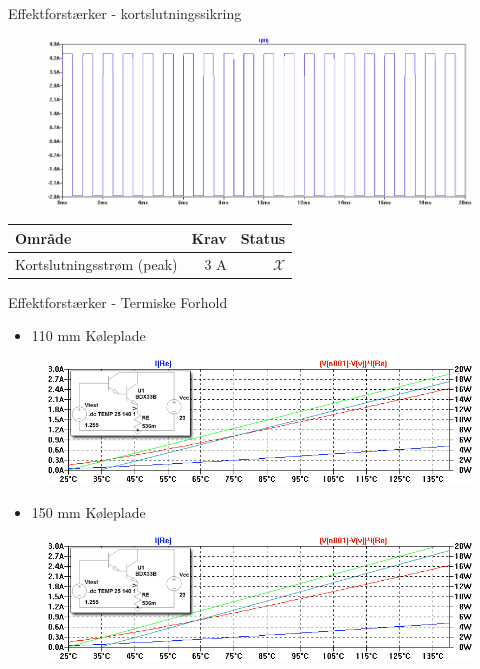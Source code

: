 \begin{frame}{Effektforstærker - kortslutningssikring}

\begin{figure}[h]
\centering
\includegraphics[width=\textwidth]{images/kortslut-graf.png}
\end{figure}

\scriptsize{\begin{table}[h]
\centering
\begin{tabular}{l|r|r}
\hline\hline
Område & Krav & Status  \\
\hline\hline
Kortslutningsstrøm (peak) & 3 A & $\mathcal{X}$\\
\hline\hline
\end{tabular}
\end{table}}

\end{frame}



\begin{frame}{Effektforstærker - Termiske Forhold}

\begin{itemize}
\item 110 mm Køleplade
\end{itemize}
\begin{figure}[h]
\centering
\includegraphics[width=\textwidth]{images/term-runaway.png}
\end{figure}

\begin{itemize}
\item 150 mm Køleplade 
\end{itemize}
\begin{figure}[h]
\centering
\includegraphics[width=\textwidth]{images/term-runaway1.png}
\end{figure}

\end{frame}


